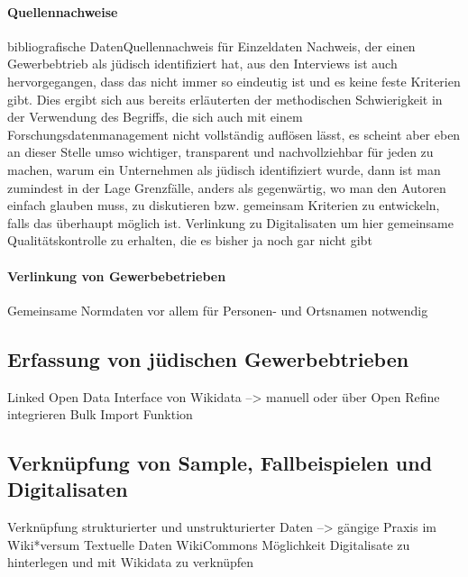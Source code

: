 \paragraph{Quellennachweise}
bibliografische DatenQuellennachweis für Einzeldaten
Nachweis, der einen Gewerbebtrieb als jüdisch identifiziert hat, aus den Interviews ist auch hervorgegangen, dass das nicht immer so eindeutig ist und es keine feste Kriterien gibt. Dies ergibt sich aus bereits erläuterten der methodischen Schwierigkeit in der Verwendung des Begriffs, die sich auch mit einem Forschungsdatenmanagement nicht vollständig auflösen lässt, es scheint aber eben an dieser Stelle umso wichtiger, transparent und nachvollziehbar für jeden zu machen, warum ein Unternehmen als jüdisch identifiziert wurde, dann ist man zumindest in der Lage Grenzfälle, anders als gegenwärtig, wo man den Autoren einfach glauben muss, zu diskutieren bzw. gemeinsam Kriterien zu entwickeln, falls das überhaupt möglich ist.
Verlinkung zu Digitalisaten um hier gemeinsame Qualitätskontrolle zu erhalten, die es bisher ja noch gar nicht gibt
\paragraph{Verlinkung von Gewerbebetrieben}
Gemeinsame Normdaten vor allem für Personen- und Ortsnamen notwendig
\subsection{Erfassung von jüdischen Gewerbebtrieben}
Linked Open Data Interface von Wikidata --> manuell oder über Open Refine integrieren Bulk Import Funktion
\subsection{Verknüpfung von Sample, Fallbeispielen und Digitalisaten}
Verknüpfung strukturierter und unstrukturierter Daten --> gängige Praxis im Wiki*versum
Textuelle Daten
WikiCommons Möglichkeit Digitalisate zu hinterlegen und mit Wikidata zu verknüpfen

